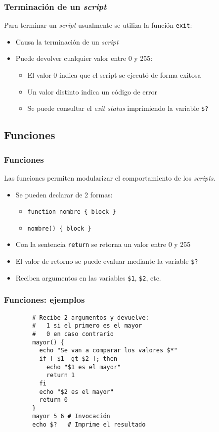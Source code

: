 \begin{frame}[fragile]
	\frametitle{Terminación de un \textit{script}}
    Para terminar un \textit{script} usualmente se utiliza la función \texttt{exit}:
	\begin{itemize}
		\item Causa la terminación de un \textit{script}
		\item Puede devolver cualquier valor entre 0 y 255:
		\begin{itemize}
			\item El valor 0 indica que el script se ejecutó de forma exitosa
			\item Un valor distinto indica un código de error
			\item Se puede consultar el \textit{exit status} imprimiendo la
              variable \texttt{\$?}
		\end{itemize}
	\end{itemize}
\end{frame}

\subsection{Funciones}
\begin{frame}[fragile]
	\frametitle{Funciones}
    Las funciones permiten modularizar el comportamiento de los \textit{scripts}.
	\begin{itemize}
		\item Se pueden declarar de 2 formas:
          \begin{itemize}
		\item \verb+function nombre { block }+
		\item \verb+nombre() { block }+
        \end{itemize}
		\item Con la sentencia \texttt{return} se retorna un valor entre 0 y 255
		\item El valor de retorno se puede evaluar mediante la variable \texttt{\$?}
		\item Reciben argumentos en las variables \texttt{\$1},
          \texttt{\$2}, etc.
	\end{itemize}
\end{frame}

\begin{frame}[fragile]
	\frametitle{Funciones: ejemplos}
	\begin{lstlisting}
		# Recibe 2 argumentos y devuelve:
		#   1 si el primero es el mayor
		#   0 en caso contrario
		mayor() {
		  echo "Se van a comparar los valores $*" 
		  if [ $1 -gt $2 ]; then
		    echo "$1 es el mayor" 
		    return 1
		  fi
		  echo "$2 es el mayor"
		  return 0
		}
		mayor 5 6 # Invocación
		echo $?   # Imprime el resultado
	\end{lstlisting}
\end{frame}
